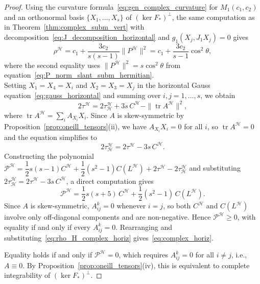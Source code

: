 \documentclass[11pt]{amsart}
\theoremstyle{plain}
\theoremstyle{definition}
\theoremstyle{remark}
\newcommand{\calH}{\mathcal{H}}
\begin{document}
\begin{proof}
Using the curvature formula~\eqref{eq:gen_complex_curvature} 
for $M_1(c_1,c_2)$ and an orthonormal basis 
$\{X_1,\ldots,X_s\}$ of $(\ker F_*)^\perp$, the same 
computation as in Theorem~\ref{thm:complex_subm_vert} 
with decomposition~\eqref{eq:J_decomposition_horizontal} 
and $g_1(X_j, J_1X_j) = 0$ gives
\begin{equation}\label{eq:rho_H_complex_horiz}
\rho^{\calH} = c_1 + \dfrac{3c_2}{s(s-1)}\|P^{\calH}\|^2
= c_1 + \dfrac{3c_2}{s-1}\cos^2\theta,
\end{equation}
where the second equality uses 
$\|P^{\calH}\|^2 = s\cos^2\theta$ from 
equation~\eqref{eq:P_norm_slant_subm_hermitian}.\\

Setting $X_1 = X_4 = X_i$ and $X_2 = X_3 = X_j$ in 
the horizontal Gauss equation~\eqref{eq:gauss_horizontal} 
and summing over $i,j = 1,\ldots,s$, we obtain
\[
2\tau^{\calH} = 2\tau^{\calH}_{\calH} 
+ 3s\,C^{\calH} - \|\operatorname{tr} A^{\calH}\|^2,
\]
where $\operatorname{tr} A^{\calH} = \sum_i A_{X_i}X_i$. 
Since $A$ is skew-symmetric by 
Proposition~\ref{prop:oneill_tensors}(ii), we have 
$A_{X_i}X_i = 0$ for all $i$, so 
$\operatorname{tr} A^{\calH} = 0$ and the equation 
simplifies to
\[
2\tau^{\calH}_{\calH} = 2\tau^{\calH} - 3s\,C^{\calH}.
\]
Constructing the polynomial 
$\mathcal{P}^{\calH} = \dfrac{1}{2}s(s-1)C^{\calH} 
+ \dfrac{1}{2}(s^2-1)C(L^{\calH}) 
+ 2\tau^{\calH} - 2\tau^{\calH}_{\calH}$
and substituting $2\tau^{\calH}_{\calH}=2\tau^{\calH}-3s\,C^{\calH}$, a
direct computation gives
\[
\mathcal{P}^{\calH}
= \dfrac{1}{2}s(s+5)\,C^{\calH}
+ \dfrac{1}{2}(s^2-1)\,C(L^{\calH}).
\]
Since $A$ is skew-symmetric, $A_{ij}^k=0$ whenever $i=j$, so both
$C^{\calH}$ and $C(L^{\calH})$ involve only off-diagonal components and
are non-negative. Hence $\mathcal{P}^{\calH}\ge 0$, with equality if and
only if every $A_{ij}^k=0$. Rearranging and
substituting~\eqref{eq:rho_H_complex_horiz} gives~\eqref{eq:complex_horiz}. 


Equality holds if and only if $\mathcal{P}^{\calH} = 0$, 
which requires $A_{ij}^k = 0$ for all $i \neq j$, i.e., 
$A \equiv 0$. By 
Proposition~\ref{prop:oneill_tensors}(iv), this is 
equivalent to complete integrability of $(\ker F_*)^\perp$.
\end{proof}
\end{document}
